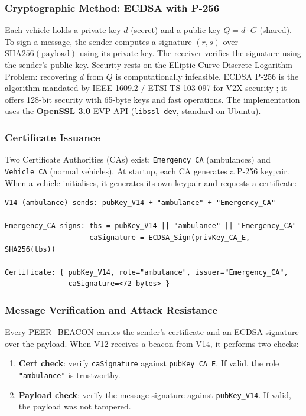 \documentclass[fleqn,10pt]{olplainarticle}
\begin{document}
\subsubsection{Cryptographic Method: ECDSA with P-256}

Each vehicle holds a private key $d$ (secret) and a public key $Q = d \cdot G$ (shared). To sign a message, the sender computes a signature $(r,s)$ over $\mathrm{SHA256}(\text{payload})$ using its private key. The receiver verifies the signature using the sender's public key. Security rests on the Elliptic Curve Discrete Logarithm Problem: recovering $d$ from $Q$ is computationally infeasible. ECDSA P-256 is the algorithm mandated by IEEE 1609.2 / ETSI TS 103 097 for V2X security \cite{10075082}; it offers 128-bit security with 65-byte keys and fast operations. The implementation uses the \textbf{OpenSSL 3.0} EVP API (\texttt{libssl-dev}, standard on Ubuntu).

\subsubsection{Certificate Issuance}

Two Certificate Authorities (CAs) exist: \texttt{Emergency\_CA} (ambulances) and \texttt{Vehicle\_CA} (normal vehicles). At startup, each CA generates a P-256 keypair. When a vehicle initialises, it generates its own keypair and requests a certificate:

\begin{verbatim}
V14 (ambulance) sends: pubKey_V14 + "ambulance" + "Emergency_CA"

Emergency_CA signs: tbs = pubKey_V14 || "ambulance" || "Emergency_CA"
                    caSignature = ECDSA_Sign(privKey_CA_E, SHA256(tbs))

Certificate: { pubKey_V14, role="ambulance", issuer="Emergency_CA",
               caSignature=<72 bytes> }
\end{verbatim}

\subsubsection{Message Verification and Attack Resistance}

Every PEER\_BEACON carries the sender's certificate and an ECDSA signature over the payload. When V12 receives a beacon from V14, it performs two checks:

\begin{enumerate}
    \item \textbf{Cert check}: verify \texttt{caSignature} against \texttt{pubKey\_CA\_E}. If valid, the role \texttt{"ambulance"} is trustworthy.
    \item \textbf{Payload check}: verify the message signature against \texttt{pubKey\_V14}. If valid, the payload was not tampered.
\end{enumerate}
\end{document}
